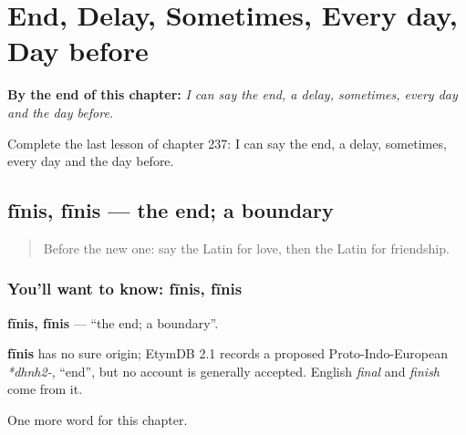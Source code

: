 
\chapter{End, Delay, Sometimes, Every day, Day before}
\label{ch:la-end-delay-sometimes-every-day-day-before}

\begin{chapteropening}
\textbf{By the end of this chapter:} \emph{I can say the end, a delay, sometimes, every day and the day before.}

Complete the last lesson of chapter 237: I can say the end, a delay, sometimes, every day and the day before.
\end{chapteropening}

\section[fīnis, fīnis]{fīnis, fīnis — the end; a boundary}

\label{lesson:LA-C237-finis}



\begin{quote}
Before the new one: say the Latin for love, then the Latin for friendship.
\end{quote}

\subsection*{You'll want to know: fīnis, fīnis}
\textbf{fīnis, fīnis} — \textquotedblleft{}the end; a boundary\textquotedblright{}.

\begin{cousinweb}
\textbf{fīnis} has no sure origin; EtymDB 2.1 records a proposed Proto-Indo-European \emph{*dhnh2-}, \textquotedblleft{}end\textquotedblright{}, but no account is generally accepted. English \emph{final} and \emph{finish} come from it.
\end{cousinweb}

\begin{grammarlens}[title={What you've built}]
One more word for this chapter.
\end{grammarlens}

